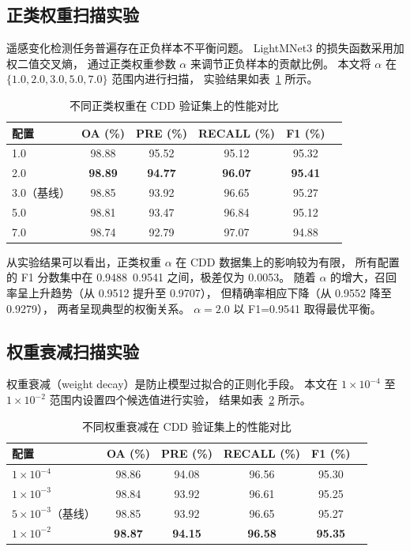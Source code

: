 \documentclass[UTF8]{ctexart}
\begin{document}
\subsection{正类权重扫描实验}

遥感变化检测任务普遍存在正负样本不平衡问题。
LightMNet3 的损失函数采用加权二值交叉熵，
通过正类权重参数 $\alpha$ 来调节正负样本的贡献比例。
本文将 $\alpha$ 在 $\{1.0, 2.0, 3.0, 5.0, 7.0\}$ 范围内进行扫描，
实验结果如表~\ref{tab:posw_scan} 所示。

\begin{table}[htbp]
\centering
\caption{不同正类权重在 CDD 验证集上的性能对比}
\label{tab:posw_scan}
\begin{tabular}{lccccc}
\hline
配置 & OA (\%) & PRE (\%) & RECALL (\%) & F1 (\%) \\
\hline
1.0 & 98.88 & 95.52 & 95.12 & 95.32 \\
2.0 & \textbf{98.89} & \textbf{94.77} & \textbf{96.07} & \textbf{95.41} \\
3.0（基线） & 98.85 & 93.92 & 96.65 & 95.27 \\
5.0 & 98.81 & 93.47 & 96.84 & 95.12 \\
7.0 & 98.74 & 92.79 & 97.07 & 94.88 \\
\hline
\end{tabular}
\end{table}

从实验结果可以看出，正类权重 $\alpha$ 在 CDD 数据集上的影响较为有限，
所有配置的 F1 分数集中在 0.9488~0.9541 之间，极差仅为 0.0053。
随着 $\alpha$ 的增大，召回率呈上升趋势（从 0.9512 提升至 0.9707），
但精确率相应下降（从 0.9552 降至 0.9279），
两者呈现典型的权衡关系。
$\alpha=2.0$ 以 F1=0.9541 取得最优平衡。

\subsection{权重衰减扫描实验}

权重衰减（weight decay）是防止模型过拟合的正则化手段。
本文在 $1\times10^{-4}$ 至 $1\times10^{-2}$ 范围内设置四个候选值进行实验，
结果如表~\ref{tab:wd_scan} 所示。

\begin{table}[htbp]
\centering
\caption{不同权重衰减在 CDD 验证集上的性能对比}
\label{tab:wd_scan}
\begin{tabular}{lccccc}
\hline
配置 & OA (\%) & PRE (\%) & RECALL (\%) & F1 (\%) \\
\hline
$1\times10^{-4}$ & 98.86 & 94.08 & 96.56 & 95.30 \\
$1\times10^{-3}$ & 98.84 & 93.92 & 96.61 & 95.25 \\
$5\times10^{-3}$（基线） & 98.85 & 93.92 & 96.65 & 95.27 \\
$1\times10^{-2}$ & \textbf{98.87} & \textbf{94.15} & \textbf{96.58} & \textbf{95.35} \\
\hline
\end{tabular}
\end{table}
\end{document}
